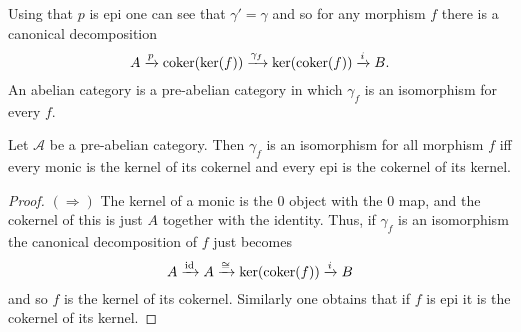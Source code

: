 \documentclass{memoir}
\begin{document}
Using that $p$ is epi one can see that $\gamma'=\gamma$ and so for any morphism $f$ there is a canonical decomposition
\begin{equation}
    A\xrightarrow{p} \operatorname{coker}(\ker(f)) \xrightarrow{\gamma_f} \ker(\operatorname{coker}(f)) \xrightarrow{i} B.
\end{equation}
An abelian category is a pre-abelian category in which $\gamma_f$ is an isomorphism for every $f$.
\begin{thm}
    \label{thm:abcat}
    Let $\mathcal A$ be a pre-abelian category.
    Then $\gamma_f$ is an isomorphism for all morphism $f$ iff every monic is the kernel of its cokernel and every epi is the cokernel of its kernel.
\end{thm}
\begin{proof}
    $(\Rightarrow)$ The kernel of a monic is the $0$ object with the $0$ map, and the cokernel of this is just $A$ together with the identity.
    Thus, if $\gamma_f$ is an isomorphism the canonical decomposition of $f$ just becomes
    \begin{equation}
        A\xrightarrow{\operatorname{id}} A \xrightarrow{\cong} \ker(\operatorname{coker}(f)) \xrightarrow{i} B
    \end{equation}
    and so $f$ is the kernel of its cokernel. 
    Similarly one obtains that if $f$ is epi it is the cokernel of its kernel.
    

\end{proof}
\end{document}
